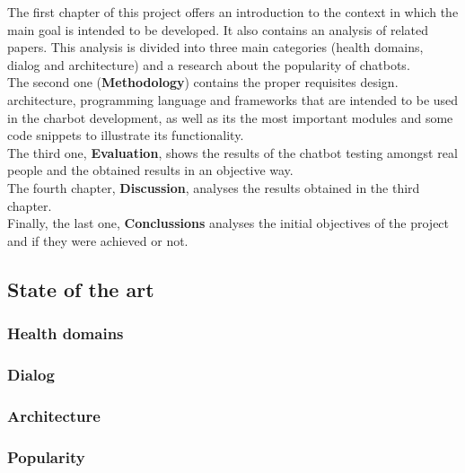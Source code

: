 \documentclass[12pt,english]{article}
\begin{document}
The first chapter of this project offers an introduction to the context in which the main goal is intended to be developed. It also contains an analysis of related papers. This analysis is divided into three main categories (health domains, dialog and architecture) and a research about the popularity of chatbots.\\

The second one (\textbf{Methodology}) contains the proper requisites design. architecture, programming language and frameworks that are intended to be used in the charbot development, as well as its the most important modules and some code snippets to illustrate its functionality.\\

The third one, \textbf{Evaluation}, shows the results of the chatbot testing amongst real people and the obtained results in an objective way.\\

The fourth chapter, \textbf{Discussion}, analyses the results obtained in the third chapter.\\

Finally, the last one, \textbf{Conclussions} analyses the initial objectives of the project and if they were achieved or not.



\newpage
\subsection{State of the art}

\subsubsection{Health domains}

\subsubsection{Dialog}

\subsubsection{Architecture}

\subsubsection{Popularity}
\end{document}
